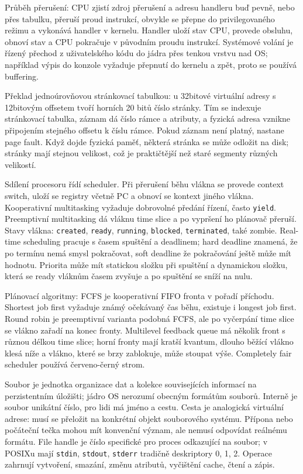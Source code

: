 \begin{odpoved}
Průběh přerušení: CPU zjistí zdroj přerušení a adresu handleru buď pevně, nebo přes
tabulku, přeruší proud instrukcí, obvykle se přepne do privilegovaného režimu a vykonává
handler v kernelu. Handler uloží stav CPU, provede obsluhu, obnoví stav a CPU pokračuje v
původním proudu instrukcí. Systémové volání je řízený přechod z uživatelského kódu do
jádra přes tenkou vrstvu nad OS; například výpis do konzole vyžaduje přepnutí do kernelu
a zpět, proto se používá buffering.

Překlad jednoúrovňovou stránkovací tabulkou: u 32bitové virtuální adresy s 12bitovým
offsetem tvoří horních 20 bitů číslo stránky. Tím se indexuje stránkovací tabulka,
záznam dá číslo rámce a atributy, a fyzická adresa vznikne připojením stejného offsetu k
číslu rámce. Pokud záznam není platný, nastane page fault. Když dojde fyzická paměť,
některá stránka se může odložit na disk; stránky mají stejnou velikost, což je praktičtější
než staré segmenty různých velikostí.

Sdílení procesoru řídí scheduler. Při přerušení běhu vlákna se provede context switch,
uloží se registry včetně PC a obnoví se kontext jiného vlákna. Kooperativní multitasking
vyžaduje dobrovolné předání řízení, často \texttt{yield}. Preemptivní multitasking dá
vláknu time slice a po vypršení ho plánovač přeruší. Stavy vlákna: \texttt{created},
\texttt{ready}, \texttt{running}, \texttt{blocked}, \texttt{terminated}, také zombie.
Real-time scheduling pracuje s časem spuštění a deadlinem; hard deadline znamená, že po
termínu nemá smysl pokračovat, soft deadline že pokračování ještě může mít hodnotu.
Priorita může mít statickou složku při spuštění a dynamickou složku, která se ready
vláknům časem zvyšuje a po spuštění se sníží na nulu.

Plánovací algoritmy: FCFS je kooperativní FIFO fronta v pořadí příchodu. Shortest job
first vyžaduje známý očekávaný čas běhu, existuje i longest job first. Round robin je
preemptivní varianta podobná FCFS, ale po vyčerpání time slice se vlákno zařadí na konec
fronty. Multilevel feedback queue má několik front s různou délkou time slice; horní
fronty mají kratší kvantum, dlouho běžící vlákno klesá níže a vlákno, které se brzy
zablokuje, může stoupat výše. Completely fair scheduler používá červeno-černý strom.

Soubor je jednotka organizace dat a kolekce souvisejících informací na perzistentním
úložišti; jádro OS nerozumí obecným formátům souborů. Interně je soubor unikátní číslo,
pro lidi má jméno a cestu. Cesta je analogická virtuální adrese: musí se přeložit na
konkrétní objekt souborového systému. Přípona nebo počáteční tečka mohou mít konvenční
význam, ale nemusí odpovídat reálnému formátu. File handle je číslo specifické pro proces
odkazující na soubor; v POSIXu mají \texttt{stdin}, \texttt{stdout}, \texttt{stderr} tradičně
deskriptory 0, 1, 2. Operace zahrnují vytvoření, smazání, změnu atributů, vyčištění cache,
čtení a zápis.


\end{odpoved}
